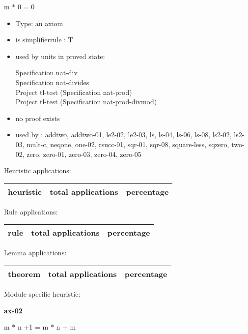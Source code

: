 \documentclass[a4paper]{article}
\begin{document}
\medskip

 \Fol m $*$ 0 = 0

\begin{itemize}

\item Type: an axiom

\item is simplifierrule : T
\item used by units in proved state:

Specification nat-div \\
Specification nat-divides \\
Project tl-test (Specification nat-prod) \\
Project tl-test (Specification nat-prod-divmod)
\item       no proof exists
\item       used by      : addtwo, addtwo-01, le2-02, le2-03, ls, ls-04, ls-06, ls-08, ls2-02, ls2-03, mult-c, neqone, one-02, rsucc-01, sqr-01, sqr-08, square-less, sqzero, two-02, zero, zero-01, zero-03, zero-04, zero-05
\end{itemize}

\medskip


Heuristic applications:

\begin{supertabular}{l|r|r}
heuristic	& total applications & percentage \\ \hline

\end{supertabular}

Rule applications:

\begin{supertabular}{l|r|r}
rule	        & total applications & percentage \\ \hline

\end{supertabular}

Lemma applications:

\begin{supertabular}{l|r|r}
theorem	        & total applications & percentage \\ \hline

\end{supertabular}

Module specific heuristic:

\pagebreak

{\LARGE\bf ax-02}\label{lemma-ax-02}

\medskip

 \Fol m $*$ n +1 = m $*$ n + m
\end{document}
